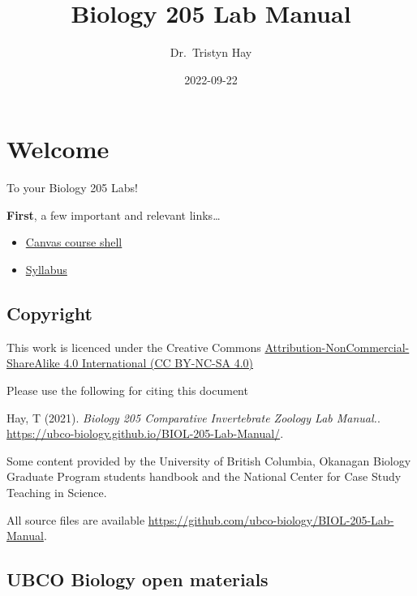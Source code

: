 \documentclass[
]{book}
\title{Biology 205 Lab Manual}
\author{Dr.~Tristyn Hay}
\date{2022-09-22}
\providecommand{\tightlist}{%
  \setlength{\itemsep}{0pt}\setlength{\parskip}{0pt}}
\begin{document}
\maketitle

{
\setcounter{tocdepth}{1}
\tableofcontents
}
\hypertarget{welcome}{%
\chapter*{Welcome}\label{welcome}}

To your Biology 205 Labs!

\textbf{First}, a few important and relevant links\ldots{}

\begin{itemize}
\tightlist
\item
  \href{https://canvas.ubc.ca/courses/113910}{Canvas course shell}
\item
  \href{https://canvas.ubc.ca/courses/113910/files/21718741?module_item_id=4662232}{Syllabus}
\end{itemize}

\hypertarget{copyright}{%
\section*{Copyright}\label{copyright}}

This work is licenced under the Creative Commons \href{https://creativecommons.org/licenses/by-nc-sa/4.0/}{Attribution-NonCommercial-ShareAlike 4.0 International (CC BY-NC-SA 4.0)}

Please use the following for citing this document

Hay, T (2021). \emph{Biology 205 Comparative Invertebrate Zoology Lab Manual.}. \url{https://ubco-biology.github.io/BIOL-205-Lab-Manual/}.

Some content provided by the University of British Columbia, Okanagan Biology Graduate Program students handbook and the National Center for Case Study Teaching in Science.

All source files are available \url{https://github.com/ubco-biology/BIOL-205-Lab-Manual}.

\hypertarget{ubco-biology-open-materials}{%
\section*{UBCO Biology open materials}\label{ubco-biology-open-materials}}
\end{document}
